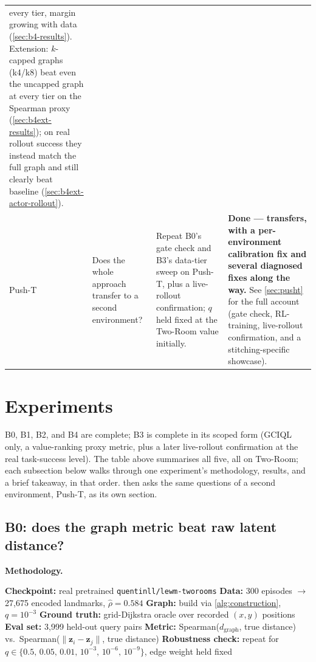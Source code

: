 \documentclass[11pt]{article}
\newcommand{\dgraph}{d_{\mathrm{graph}}}
\newcommand{\zv}{\mathbf{z}}
\begin{document}
\begin{center}
\begin{longtable}{@{}p{0.5cm}p{3.5cm}p{5.1cm}p{4.6cm}@{}}
every tier, margin growing with data (\cref{sec:b4-results}). Extension: $k$-capped graphs
(k4/k8) beat even the uncapped graph at every tier on the Spearman proxy
(\cref{sec:b4ext-results}); on real rollout success they instead match the full graph and still
clearly beat baseline (\cref{sec:b4ext-actor-rollout}). \\
\addlinespace
Push-T & Does the whole approach transfer to a second environment? & Repeat B0's gate check and
B3's data-tier sweep on Push-T, plus a live-rollout confirmation; $q$ held fixed at the
Two-Room value initially. & \textcolor{cAmber}{\textbf{Done --- transfers, with a per-environment
calibration fix and several diagnosed fixes along the way.}} See \cref{sec:pusht} for the full
account (gate check, RL-training, live-rollout confirmation, and a stitching-specific showcase). \\
\end{longtable}
\end{center}

\section{Experiments}

B0, B1, B2, and B4 are complete; B3 is complete in its scoped form (GCIQL only, a value-ranking
proxy metric, plus a later live-rollout confirmation at the real task-success level). The table
above summarises all five, all on Two-Room; each subsection below walks through one experiment's
methodology, results, and a brief takeaway, in that order.  then asks the same
questions of a second environment, Push-T, as its own section.

\subsection{B0: does the graph metric beat raw latent distance?}
\label{sec:b0-results}

\textbf{Methodology.}

\begin{algorithm}[H]
\caption{B0 methodology}
\begin{algorithmic}[1]
\State \textbf{Checkpoint:} real pretrained \texttt{quentinll/lewm-tworooms} 
\State \textbf{Data:} 300 episodes $\to$ 27{,}675 encoded landmarks, $\hat\rho = 0.584$
\State \textbf{Graph:} build via \cref{alg:construction}, $q = 10^{-3}$
\State \textbf{Ground truth:} grid-Dijkstra oracle over recorded $(x,y)$ positions 
\State \textbf{Eval set:} 3{,}999 held-out query pairs
\State \textbf{Metric:} Spearman($\dgraph$, true distance) vs.\ Spearman($\|\zv_i-\zv_j\|$, true distance)
\State \textbf{Robustness check:} repeat for $q \in \{0.5,\,0.05,\,0.01,\,10^{-3},\,10^{-6},\,10^{-9}\}$, edge weight held fixed
\end{algorithmic}
\end{algorithm}
\end{document}
